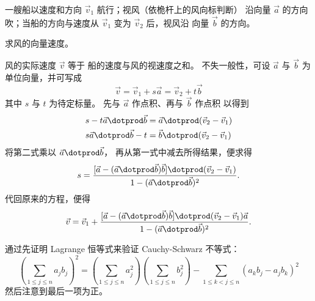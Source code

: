   \puzzle \item 
    \cite{Monthly33p118}
    一艘船以速度和方向 \( \vec{v}_1 \) 航行；视风（依桅杆上的风向标判断）
    沿向量
    \( \vec{a} \) 的方向吹；当船的方向与速度从
    \( \vec{v}_1 \) 变为 \( \vec{v}_2 \) 后，视风沿
    向量 \( \vec{b} \) 的方向。

    求风的向量速度。
    \begin{answer}
      \answerasgiven %
      风的实际速度 \( \vec{v} \) 等于
      船的速度与风的视速度之和。
      不失一般性，可设 \( \vec{a} \) 与
      \( \vec{b} \) 为单位向量，并可写成
      \begin{equation*}
         \vec{v}=\vec{v}_1+s\vec{a}=\vec{v}_2+t\vec{b}
      \end{equation*}
      其中 \( s \) 与 \( t \) 为待定标量。
      先与 \( \vec{a} \) 作点积、再与 \( \vec{b} \) 作点积
      以得到
      \begin{align*}
         s-t\vec{a}\dotprod\vec{b}
         &=\vec{a}\dotprod(\vec{v}_2-\vec{v}_1)    \\
         s\vec{a}\dotprod\vec{b}-t
         &=\vec{b}\dotprod(\vec{v}_2-\vec{v}_1)
      \end{align*}
      将第二式乘以 \( \vec{a}\dotprod\vec{b} \)， 
      再从第一式中减去所得结果，便求得
      \begin{equation*}
         s=
         \frac{[\vec{a}-(\vec{a}\dotprod\vec{b})\vec{b}]
                   \dotprod(\vec{v}_2-\vec{v}_1)
              }{1-(\vec{a}\dotprod\vec{b})^2}.
      \end{equation*}
      代回原来的方程，便得
      \begin{equation*}
         \vec{v}=\vec{v}_1+
         \frac{[\vec{a}-(\vec{a}\dotprod\vec{b})\vec{b}]
                 \dotprod(\vec{v}_2-\vec{v}_1)
             \vec{a}}{1-(\vec{a}\dotprod\vec{b})^2}.
      \end{equation*}  
    \end{answer}
  \item  
     通过先证明
     Lagrange 恒等式来验证 Cauchy-Schwarz 不等式：
     \begin{equation*}
      \left(\sum_{1\leq j\leq n} a_jb_j \right)^2
      =
      \left(\sum_{1\leq j\leq n}a_j^2\right)
      \left(\sum_{1\leq j\leq n}b_j^2\right)
      -
      \sum_{1\leq k < j\leq n}(a_kb_j-a_jb_k)^2
     \end{equation*}
     然后注意到最后一项为正。
